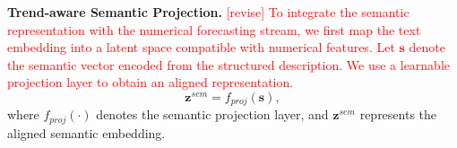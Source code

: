 \documentclass[Afour,sageh,times]{sagej}
\newcommand{\zhang}[1]{\textcolor{red}{[revise] #1}}
\begin{document}
{\textbf{Trend-aware Semantic Projection.} 
\zhang{To integrate the semantic representation with the numerical forecasting stream, we first map the text embedding into a latent space compatible with numerical features. Let $\mathbf{s}$ denote the semantic vector encoded from the structured description. We use a learnable projection layer to obtain an aligned representation.}
\begin{equation}
\mathbf{z}^{sem} = f_{proj}(\mathbf{s}),
\end{equation}
where $f_{proj}(\cdot)$ denotes the semantic projection layer, and $\mathbf{z}^{sem}$ represents the aligned semantic embedding.





}
\end{document}
